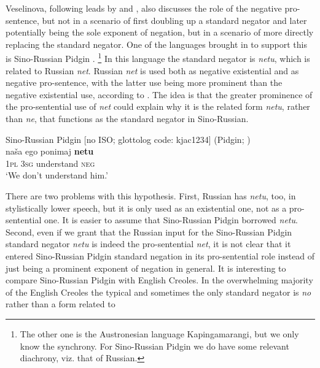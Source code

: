 ﻿\documentclass[output=paper]{langsci/langscibook}
\begin{document}
Veselinova, following leads by \textcite[21]{Croft1991} and
\textcite[38--39]{Schwegler1988}, also discusses the role of the negative
pro-sentence, but not in a scenario of first doubling up a standard negator
and later potentially being the sole exponent of negation, but in a
scenario of more directly replacing the standard negator. One of the
languages brought in to support this is Sino-Russian Pidgin
\parencites[1337]{Veselinova2014}[155--156]{Veselinova2016}.%
%
    \footnote{The other one is the Austronesian language Kapingamarangi,
    but we only know the synchrony. For Sino-Russian Pidgin we do have some
    relevant diachrony, viz.  that of Russian.}  %
%
In this language the standard negator is \textit{netu},
which is related to Russian \textit{net}. Russian \textit{net} is used both
as negative existential and as negative pro-sentence, with the latter use
being more prominent than the negative existential use, according to
\textcite[1337]{Veselinova2014}. The idea is that the greater prominence
of the pro-sentential use of \textit{net} could explain why it is the
related form \textit{netu}, rather than \textit{ne}, that functions as the
standard negator in Sino-Russian.
%
\begin{exe}\ex\label{ex:int-sinorussian-understand}
Sino-Russian Pidgin [no ISO; glottolog code: kjac1234] (Pidgin;
\cites[1337]{Veselinova2014}[19]{Stern2002})\\
    \gll naša    ego  ponimaj  \textbf{netu} \\
\textsc{1pl}    \textsc{3sg}  understand  \textsc{neg} \\
    \glt `We don't understand him.'
    \end{exe}
%
There are two problems with this hypothesis. First, Russian has
\textit{netu}, too, in stylistically lower speech, but it is only used as
an existential one, not as a pro-sentential one. It is easier to assume
that Sino-Russian Pidgin borrowed \textit{netu}. Second, even if we grant
that the Russian input for the Sino-Russian Pidgin standard negator
\textit{netu} is indeed the pro-sentential \textit{net}, it is not clear
that it entered Sino-Russian Pidgin standard negation in its pro-sentential
role instead of just being a prominent exponent of negation in general. It
is interesting to compare Sino-Russian Pidgin with
English Creoles. In the
overwhelming majority of the English Creoles the typical and sometimes the
only standard negator is \textit{no} rather than a form related to
\end{document}
